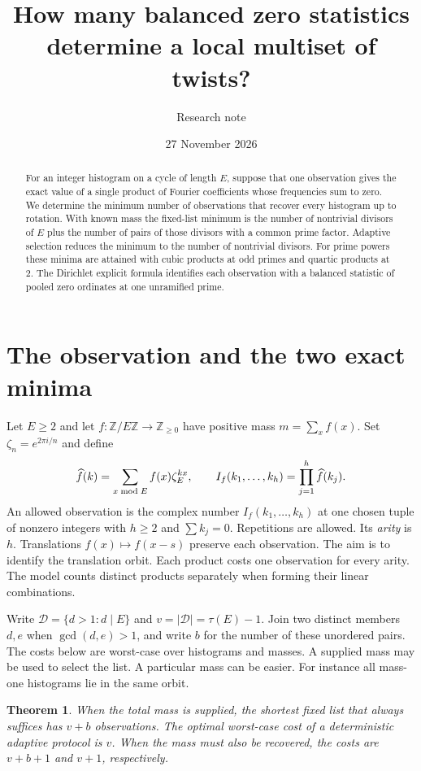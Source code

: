 \documentclass[11pt]{article}
\title{How many balanced zero statistics determine a local multiset of twists?}
\author{Research note}\date{27 November 2026}
\newtheorem{theorem}{Theorem}
\newcommand{\Z}{\mathbb Z}\newcommand{\Q}{\mathbb Q}\newcommand{\D}{\mathcal D}
\begin{document}
\maketitle
\begin{abstract}
For an integer histogram on a cycle of length $E$, suppose that one observation gives the exact value of a single product of Fourier coefficients whose frequencies sum to zero. We determine the minimum number of observations that recover every histogram up to rotation. With known mass the fixed-list minimum is the number of nontrivial divisors of $E$ plus the number of pairs of those divisors with a common prime factor. Adaptive selection reduces the minimum to the number of nontrivial divisors. For prime powers these minima are attained with cubic products at odd primes and quartic products at $2$. The Dirichlet explicit formula identifies each observation with a balanced statistic of pooled zero ordinates at one unramified prime.
\end{abstract}

\section{The observation and the two exact minima}
Let $E\ge2$ and let $f:\Z/E\Z\to\Z_{\ge0}$ have positive mass $m=\sum_x f(x)$. Set $\zeta_n=e^{2\pi i/n}$ and define
\[
 \widehat f(k)=\sum_{x\bmod E}f(x)\zeta_E^{kx},\qquad
 I_f(k_1,\ldots,k_h)=\prod_{j=1}^h\widehat f(k_j).
\]
An allowed observation is the complex number $I_f(k_1,\ldots,k_h)$ at one chosen tuple of nonzero integers with $h\ge2$ and $\sum k_j=0$. Repetitions are allowed. Its \emph{arity} is $h$. Translations $f(x)\mapsto f(x-s)$ preserve each observation. The aim is to identify the translation orbit. Each product costs one observation for every arity. The model counts distinct products separately when forming their linear combinations.

Write $\D=\{d>1:d\mid E\}$ and $v=|\D|=\tau(E)-1$. Join two distinct members $d,e$ when $\gcd(d,e)>1$, and write $b$ for the number of these unordered pairs. The costs below are worst-case over histograms and masses. A supplied mass may be used to select the list. A particular mass can be easier. For instance all mass-one histograms lie in the same orbit.

\begin{theorem}\label{thm:main}
When the total mass is supplied, the shortest fixed list that always suffices has $v+b$ observations. The optimal worst-case cost of a deterministic adaptive protocol is $v$. When the mass must also be recovered, the costs are $v+b+1$ and $v+1$, respectively.
\end{theorem}
\end{document}
